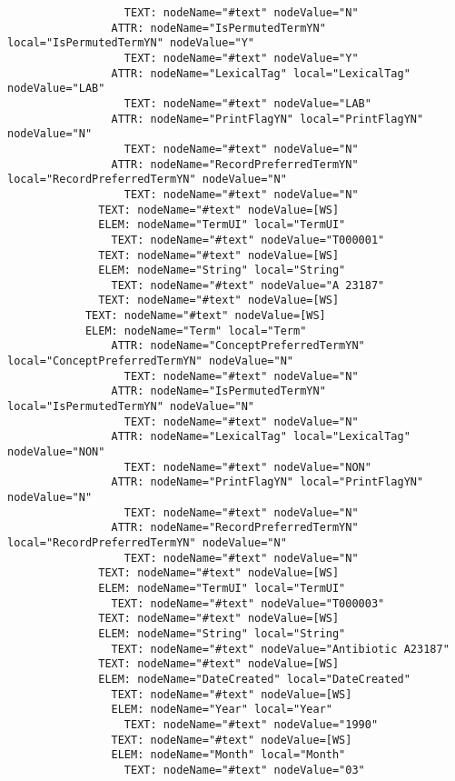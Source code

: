\documentclass[11pt,english]{article}
\begin{document}
\begin{enumerate}
\begin{lstlisting}
                  TEXT: nodeName="#text" nodeValue="N"
                ATTR: nodeName="IsPermutedTermYN" local="IsPermutedTermYN" nodeValue="Y"
                  TEXT: nodeName="#text" nodeValue="Y"
                ATTR: nodeName="LexicalTag" local="LexicalTag" nodeValue="LAB"
                  TEXT: nodeName="#text" nodeValue="LAB"
                ATTR: nodeName="PrintFlagYN" local="PrintFlagYN" nodeValue="N"
                  TEXT: nodeName="#text" nodeValue="N"
                ATTR: nodeName="RecordPreferredTermYN" local="RecordPreferredTermYN" nodeValue="N"
                  TEXT: nodeName="#text" nodeValue="N"
              TEXT: nodeName="#text" nodeValue=[WS]
              ELEM: nodeName="TermUI" local="TermUI"
                TEXT: nodeName="#text" nodeValue="T000001"
              TEXT: nodeName="#text" nodeValue=[WS]
              ELEM: nodeName="String" local="String"
                TEXT: nodeName="#text" nodeValue="A 23187"
              TEXT: nodeName="#text" nodeValue=[WS]
            TEXT: nodeName="#text" nodeValue=[WS]
            ELEM: nodeName="Term" local="Term"
                ATTR: nodeName="ConceptPreferredTermYN" local="ConceptPreferredTermYN" nodeValue="N"
                  TEXT: nodeName="#text" nodeValue="N"
                ATTR: nodeName="IsPermutedTermYN" local="IsPermutedTermYN" nodeValue="N"
                  TEXT: nodeName="#text" nodeValue="N"
                ATTR: nodeName="LexicalTag" local="LexicalTag" nodeValue="NON"
                  TEXT: nodeName="#text" nodeValue="NON"
                ATTR: nodeName="PrintFlagYN" local="PrintFlagYN" nodeValue="N"
                  TEXT: nodeName="#text" nodeValue="N"
                ATTR: nodeName="RecordPreferredTermYN" local="RecordPreferredTermYN" nodeValue="N"
                  TEXT: nodeName="#text" nodeValue="N"
              TEXT: nodeName="#text" nodeValue=[WS]
              ELEM: nodeName="TermUI" local="TermUI"
                TEXT: nodeName="#text" nodeValue="T000003"
              TEXT: nodeName="#text" nodeValue=[WS]
              ELEM: nodeName="String" local="String"
                TEXT: nodeName="#text" nodeValue="Antibiotic A23187"
              TEXT: nodeName="#text" nodeValue=[WS]
              ELEM: nodeName="DateCreated" local="DateCreated"
                TEXT: nodeName="#text" nodeValue=[WS]
                ELEM: nodeName="Year" local="Year"
                  TEXT: nodeName="#text" nodeValue="1990"
                TEXT: nodeName="#text" nodeValue=[WS]
                ELEM: nodeName="Month" local="Month"
                  TEXT: nodeName="#text" nodeValue="03"

\end{lstlisting}
\end{enumerate}
\end{document}
